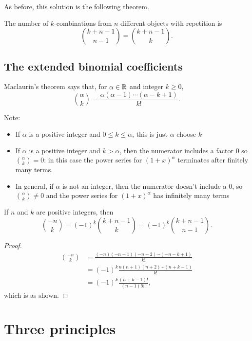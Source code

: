 \documentclass[10pt, a4paper]{article}
\begin{document}
As before,
this solution is the following theorem.
\begin{theorem}
    The number of $k$-combinations from $n$ different objects with repetition is
    \[
    \binom{k + n - 1}{n - 1} = \binom{k + n - 1}{k}.
    \]
\end{theorem}

\subsection{The extended binomial coefficients}

Maclaurin’s theorem says that, for $\alpha \in \mathbb{R}$ and integer $k \geq 0$,
\[
\binom{\alpha}{k} = \frac{\alpha(\alpha - 1)\dotsi (\alpha - k + 1)}{k!}.
\]

Note:
\begin{itemize}
    \item If $\alpha$ is a positive integer and $0 \leq k \leq \alpha$,
    this is just $\alpha$ choose $k$
    \item If $\alpha$ is a positive integer and $k > \alpha$,
    then the numerator includes a factor $0$ so $\binom{\alpha}{k} = 0$:
    in this case the power series for $(1 + x) ^ \alpha$ terminates after finitely many terms.
    \item In general,
    if $\alpha$ is not an integer, then the numerator doesn't include a $0$, so
    $\binom{\alpha}{k} \neq 0$ and the power series for $(1 + x) ^ \alpha$ has infinitely many terms
\end{itemize}

\begin{proposition}
    If $n$ and $k$ are positive integers, then
    \[
    \binom{-n}{k} = (-1) ^ k \binom{k + n - 1}{k} = (-1) ^ k \binom{k + n - 1}{n - 1}.
    \]
    \begin{proof}
        \begin{align*}
            \binom{-n}{k} &= \frac{(-n)(-n - 1)(-n - 2)\dotsi(-n - k + 1)}{k!} \\
            &= (-1) ^ k\frac{n(n + 1)(n + 2)\dotsi(n + k - 1)}{k!} \\
            &= (-1) ^ k\frac{(n + k - 1)!}{(n - 1)!k!},
        \end{align*}
        which is as shown.
    \end{proof}
\end{proposition}

\newpage

\section{Three principles}
\end{document}
